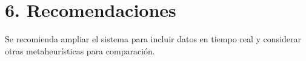 \section*{6. Recomendaciones}
Se recomienda ampliar el sistema para incluir datos en tiempo real y considerar otras metaheurísticas para comparación.
